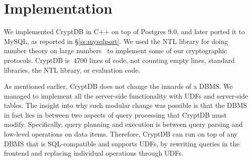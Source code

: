 \section{Implementation}
\label{s:impl}

We implemented CryptDB in C++ on top of Postgres 9.0, and later ported it
to MySQL, as reported in \S\ref{ss:mysqlport}.  We used the NTL library
for doing number theory on large numbers~\cite{shoup:ntl} to implement
some of our cryptographic protocols. CryptDB is $~4700$ lines of code,
not counting empty lines, standard libraries, the NTL library, or
evaluation code.

As mentioned earlier, CryptDB does not change the innards of a DBMS\@.
We managed to implement all the server-side functionality with UDFs and
server-side tables.  The insight into why such modular change was possible is that
the DBMS in fact lies in between two aspects of query processing that
CryptDB must modify.  Specifically, query planning and execution is
between query parsing and low-level operations on data items.
Therefore, CryptDB can
run on top of any DBMS that is SQL-compatible and supports UDFs, by
rewriting queries in the frontend and replacing individual operations
through UDFs.

